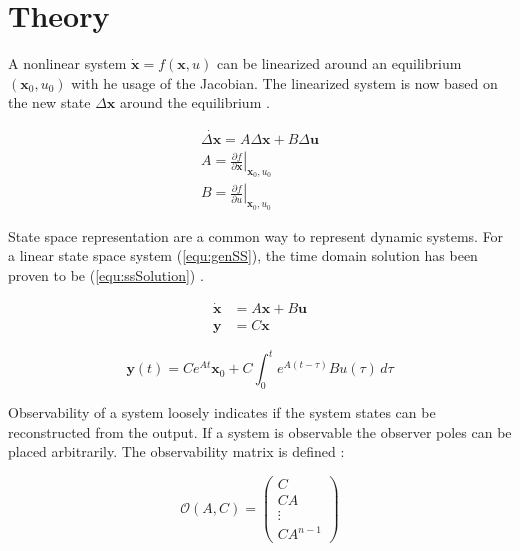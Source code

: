 \documentclass[a4paper, titlepage]{article}
\begin{document}
\section{Theory}
A nonlinear system $\dot{\textbf{x}} = f(\textbf{x},u)$ can be linearized around an equilibrium $(\textbf{x}_0, u_0)$ with he usage of the Jacobian. 
The linearized system is now based on the new state $\Delta \textbf{x}$ around the equilibrium \citep[~p.204]{astrom21}.

\begin{equation}
\begin{split}
\dot{\Delta \textbf{x}} = A \Delta \textbf{x} + B \Delta \textbf{u} \\
A = \left.\frac{\partial f}{\partial \textbf{x}}\right|_{\textbf{x}_0, u_0} \\
B = \left.\frac{\partial f}{\partial u}\right|_{\textbf{x}_0, u_0}
\end{split}
\end{equation}

State space representation are a common way to represent dynamic systems.
For a linear state space system (\ref{equ:genSS}), the time domain solution has been proven to be (\ref{equ:ssSolution}) \citep[~p.189]{astrom21}.

\begin{equation}
\begin{split}
\dot{\textbf{x}} &= A\textbf{x} + B\textbf{u} \\
\textbf{y} &= C\textbf{x}
\end{split}
\label{equ:genSS}
\end{equation}

\begin{equation}
\textbf{y}(t) = Ce^{At}\textbf{x}_0 + C \int_{0}^{t} e^{A(t-\tau)}Bu(\tau) \,d\tau
\label{equ:ssSolution}
\end{equation}

Observability of a system loosely indicates if the system states can be reconstructed from the output. If a system is observable the observer poles can be placed arbitrarily.
The observability matrix is defined \citep[p.~45]{glad00}:

\begin{equation}
\mathcal{O}(A,C) = 
\begin{pmatrix}
C \\ CA \\ \vdots \\ CA^{n-1}
\end{pmatrix}
\label{equ:obsv}
\end{equation}
\end{document}
